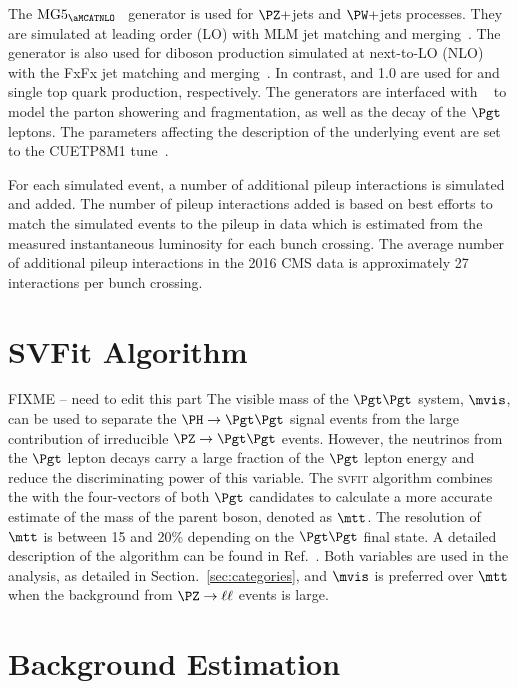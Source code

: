 The $\text{MG5}_\aMCATNLO$~\cite{Alwall:2014hca} generator is used for $\PZ+$jets and $\PW+$jets processes. 
They are simulated at leading order (LO) with MLM jet matching and merging~\cite{Alwall:2007fs}.
The \aMCATNLO generator is also used for diboson production simulated at next-to-LO (NLO) with the 
FxFx jet matching and merging~\cite{Frederix:2012ps}. In contrast,  and 1.0 are used for \ttbar
and single top quark production, respectively. The generators are interfaced with  ~\cite{Sjostrand:2014zea} to model the parton showering and fragmentation, as well as 
the decay of the $\Pgt$ leptons. The \PYTHIA parameters affecting the description of the 
underlying event are set to the {CUETP8M1} tune~\cite{Khachatryan:2015pea}.

For each simulated event, a number of additional pileup interactions is simulated and added. 
The number of pileup interactions added is based on best efforts to match the simulated
events to the pileup in data which is estimated from the measured instantaneous
luminosity for each bunch crossing. The average number of additional pileup interactions in
the 2016 CMS data is approximately 27 interactions per bunch crossing.


\section{SVFit Algorithm}
FIXME -- need to edit this part
The visible mass of the $\Pgt\Pgt$ system, $\mvis$, can be used to separate
the $\PH\to \Pgt \Pgt$ signal events
from the large contribution of irreducible $\PZ \to \Pgt \Pgt$ events.
However, the neutrinos from the $\Pgt$ lepton decays carry a large fraction of
the $\Pgt$ lepton energy and reduce the discriminating power of this variable.
The \textsc{svfit} algorithm combines the \etvecmiss with the four-vectors of both $\Pgt$ candidates
to calculate a more accurate estimate of the mass of the parent boson, denoted as $\mtt$. The resolution of $\mtt$ is between 15 and 20\% depending on the $\Pgt\Pgt$ final state.
A detailed description of the algorithm can be found
in Ref.~\cite{Bianchini:2014vza}. Both variables are used in the analysis, as detailed in Section.~\ref{sec:categories}, and $\mvis$ is preferred over $\mtt$ when the background from $\PZ \to \ell\ell$ events is large.


\section{Background Estimation}
\label{sec:background_estimation}
